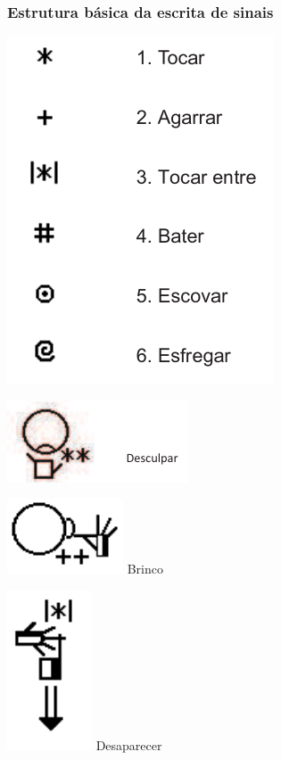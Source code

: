 \documentclass[10pt]{beamer}
\theoremstyle{plain}
\theoremstyle{definition}
\begin{document}
	\begin{frame}
		\frametitle{Estrutura básica da escrita de sinais}
		\begin{center}
			\begin{minipage}{0.3\linewidth}
				\includegraphics[scale=0.34]{figures/basico6.png}
			\end{minipage}
			\hspace{1cm}
			\begin{minipage}{0.3\linewidth}
				\includegraphics[scale=0.54]{figures/basico6-1.png}
				\vspace{0.2cm}
				
				\includegraphics[scale=0.4]{figures/basico6-2.png} Brinco
				\vspace{0.2cm}
				
				\includegraphics[scale=0.4]{figures/basico6-3.png} Desaparecer
				\vspace{0.2cm}
				

\end{minipage}
\end{center}
\end{frame}
\end{document}
